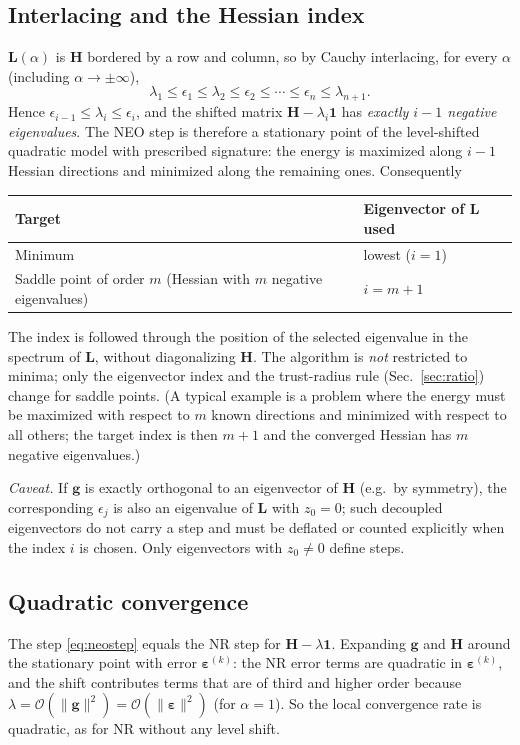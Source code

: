 \documentclass[11pt,a4paper]{article}
\newcommand{\bH}{\mathbf{H}}
\newcommand{\bL}{\mathbf{L}}
\newcommand{\bg}{\mathbf{g}}
\newcommand{\bone}{\mathbf{1}}
\begin{document}
\subsection{Interlacing and the Hessian index}
$\bL(\alpha)$ is $\bH$ bordered by a row and column, so by Cauchy interlacing, for every $\alpha$ (including $\alpha\to\pm\infty$),
\begin{equation}
 \lambda_1\le\epsilon_1\le\lambda_2\le\epsilon_2\le\cdots\le\epsilon_n\le\lambda_{n+1}.\label{eq:interlace}
\end{equation}
Hence $\epsilon_{i-1}\le\lambda_i\le\epsilon_i$, and the shifted matrix $\bH-\lambda_i\bone$ has \emph{exactly $i-1$ negative eigenvalues}. The NEO step is therefore a stationary point of the level-shifted quadratic model with prescribed signature: the energy is maximized along $i-1$ Hessian directions and minimized along the remaining ones. Consequently
\begin{center}
\begin{tabular}{ll}
\toprule
Target & Eigenvector of $\bL$ used\\
\midrule
Minimum & lowest ($i=1$)\\
Saddle point of order $m$ (Hessian with $m$ negative eigenvalues) & $i=m+1$\\
\bottomrule
\end{tabular}
\end{center}
The index is followed through the position of the selected eigenvalue in the spectrum of $\bL$, without diagonalizing $\bH$.
The algorithm is \emph{not} restricted to minima; only the eigenvector index and the trust-radius rule (Sec.~\ref{sec:ratio}) change for saddle points.
(A typical example is a problem where the energy must be maximized with respect to $m$ known directions and minimized with respect to all others; the target index is then $m+1$ and the converged Hessian has $m$ negative eigenvalues.)

\smallskip\noindent\emph{Caveat.} If $\bg$ is exactly orthogonal to an eigenvector of $\bH$ (e.g.\ by symmetry), the corresponding $\epsilon_j$ is also an eigenvalue of $\bL$ with $z_0=0$; such decoupled eigenvectors do not carry a step and must be deflated or counted explicitly when the index $i$ is chosen. Only eigenvectors with $z_0\neq0$ define steps.

\subsection{Quadratic convergence}
The step \eqref{eq:neostep} equals the NR step for $\bH-\lambda\bone$. Expanding $\bg$ and $\bH$ around the stationary point with error $\bm\varepsilon^{(k)}$: the NR error terms are quadratic in $\bm\varepsilon^{(k)}$, and the shift contributes terms that are of third and higher order because $\lambda=\mathcal O(\|\bg\|^2)=\mathcal O(\|\bm\varepsilon\|^2)$ (for $\alpha=1$). So the local convergence rate is quadratic, as for NR without any level shift.
\end{document}
